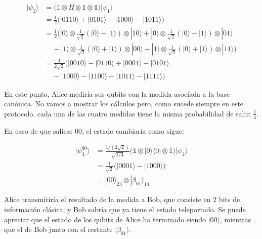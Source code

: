 \documentclass{article}
\begin{document}
\begin{align*}
  |\psi_2\rangle 
        &= \Big(
          \mathbb{1}
          \otimes H
          \otimes \mathbb{1}
          \otimes \mathbb{1}
          \Big)|\psi_1\rangle \\ 
        &= \frac{1}{2}\Big(
          |0110\rangle 
          + |0101\rangle 
          - |1000\rangle 
          - |1011\rangle
        \Big) \\ 
        &= \frac{1}{2}\Big(
          |0\rangle \otimes \frac{1}{\sqrt{2}}(
            |0\rangle - |1\rangle
          ) \otimes|10\rangle 
          + |0\rangle \otimes \frac{1}{\sqrt{2}}(
            |0\rangle - |1\rangle
          ) \otimes|01\rangle \\ 
          &\;\;\;\;- |1\rangle \otimes \frac{1}{\sqrt{2}}(
            |0\rangle + |1\rangle
          ) \otimes|00\rangle 
          - |1\rangle \otimes \frac{1}{\sqrt{2}}(
            |0\rangle + |1\rangle
          ) \otimes |11\rangle
        \Big) \\ 
        &= \frac{1}{2\sqrt{2}}\Big(
          |0010\rangle - |0110\rangle + |0001\rangle 
          - |0101\rangle \\ 
        &\;\;\;\; - |1000\rangle - |1100\rangle 
          - |1011\rangle - |1111\rangle
        \Big)
\end{align*}

En este punto, Alice mediría sus qubits con la medida asociada a la
base canónica. No vamos a mostrar los cálculos pero, como sucede
siempre en este protocolo, cada una de las cuatro medidas tiene la
misma probabilidad de salir: $\frac{1}{4}$.

En caso de que saliese $00$, el estado cambiaría como sigue:

\begin{align*}
  |\psi_3^{00}\rangle 
        &= \frac{1/(2\sqrt{2})}{\sqrt{1/4}}\Big(
          \mathbb{1}
          \otimes |0 \rangle\langle 0|
          \otimes \mathbb{1}
          \Big)|\psi_2\rangle \\ 
        &= \frac{1}{\sqrt{2}}\Big(
          |0001\rangle 
          - |1000\rangle 
        \Big) \\ 
        &= |00\rangle_{23}\otimes|\beta_{01}\rangle_{14}
\end{align*}

Alice transmitiría el resultado de la medida a Bob, que consiste en $2$ bits de
información clásica, y Bob sabría que ya tiene el estado teleportado. Se puede
apreciar que el estado de los qubits de Alice ha terminado siendo $|00\rangle$,
mientras que el de Bob junto con el restante $|\beta_{01}\rangle$.
\end{document}
